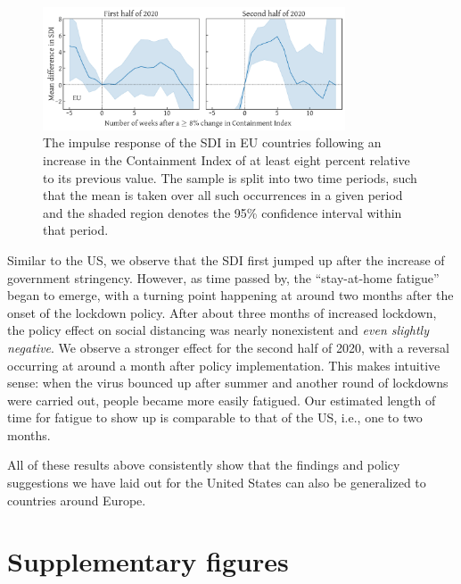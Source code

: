 \documentclass[dvipsnames]{article}
\begin{document}
\begin{figure}[htbp]
    \centering
    \includegraphics[width=0.8\textwidth]{eu_impulse_response_date.pdf}
    \caption{The impulse response of the SDI in EU countries following an increase in the Containment Index of at least eight percent relative to its previous value. The sample is split into two time periods, such that the mean is taken over all such occurrences in a given period and the shaded region denotes the 95\% confidence interval within that period.}
    \label{fig:eu_impulse_response_date}
\end{figure}

Similar to the US, we observe that the SDI first jumped up after the increase of government stringency. However, as time passed by, the ``stay-at-home fatigue'' began to emerge, with a turning point happening at around two months after the onset of the lockdown policy. After about three months of increased lockdown, the policy effect on social distancing was nearly nonexistent and \textit{even slightly negative}. We observe a stronger effect for the second half of 2020, with a reversal occurring at around a month after policy implementation. This makes intuitive sense: when the virus bounced up after summer and another round of lockdowns were carried out, people became more easily fatigued. Our estimated length of time for fatigue to show up is comparable to that of the US, i.e., one to two months.

All of these results above consistently show that the findings and policy suggestions we have laid out for the United States can also be generalized to countries around Europe.

\pagebreak
\section{Supplementary figures}
\renewcommand{\thefigure}{B\arabic{figure}}
\setcounter{figure}{0}
\end{document}
